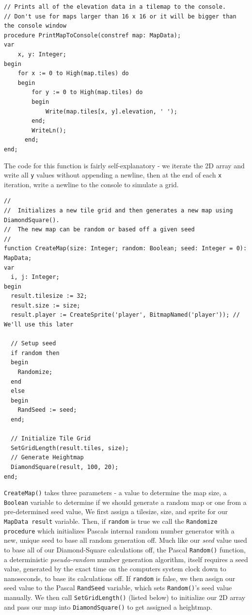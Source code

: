 \documentclass{article}
\begin{document}
\begin{verbatim}
// Prints all of the elevation data in a tilemap to the console.
// Don't use for maps larger than 16 x 16 or it will be bigger than the console window
procedure PrintMapToConsole(constref map: MapData);
var
	x, y: Integer;
begin
	for x := 0 to High(map.tiles) do
  	begin
  		for y := 0 to High(map.tiles) do
	  	begin
  			Write(map.tiles[x, y].elevation, ' ');
	  	end;
  		WriteLn();
	  end;
end;
\end{verbatim}

The code for this function is fairly self-explanatory - we iterate the 2D array and write all \texttt{y} values without appending a newline, then at the end of each \texttt{x} iteration, write a newline to the console to simulate a grid. 

\begin{verbatim}
//
//  Initializes a new tile grid and then generates a new map using DiamondSquare().
//  The new map can be random or based off a given seed
//
function CreateMap(size: Integer; random: Boolean; seed: Integer = 0): MapData;
var
  i, j: Integer;
begin
  result.tilesize := 32;
  result.size := size;
  result.player := CreateSprite('player', BitmapNamed('player')); // We'll use this later

  // Setup seed
  if random then
  begin
    Randomize;
  end
  else
  begin
    RandSeed := seed;
  end;

  // Initialize Tile Grid
  SetGridLength(result.tiles, size);
  // Generate Heightmap
  DiamondSquare(result, 100, 20);
end;
\end{verbatim}

\texttt{CreateMap()} takes three parameters - a value to determine the map size, a \texttt{Boolean} variable to determine if we should generate a random map or one from a pre-determined seed value, We first assign a tilesize, size, and sprite for our \texttt{MapData result} variable. Then, if \texttt{random} is true we call the \texttt{Randomize procedure} which initializes Pascals internal random number generator with a new, unique seed to base all random generation off. Much like our \emph{seed} value used to base all of our Diamond-Square calculations off, the Pascal \texttt{Random()} function, a deterministic \emph{pseudo-random} number generation algorithm, itself requires a seed value, generated by the exact time on the computers system clock down to nanoseconds, to base its calculations off. If \texttt{random} is false, we then assign our seed value to the Pascal \texttt{RandSeed} variable, which sets \texttt{Random()}'s seed value manually. We then call \texttt{SetGridLength()} (listed below) to initialize our 2D array and pass our map into \texttt{DiamondSquare()} to get assigned a heightmap.
\end{document}

